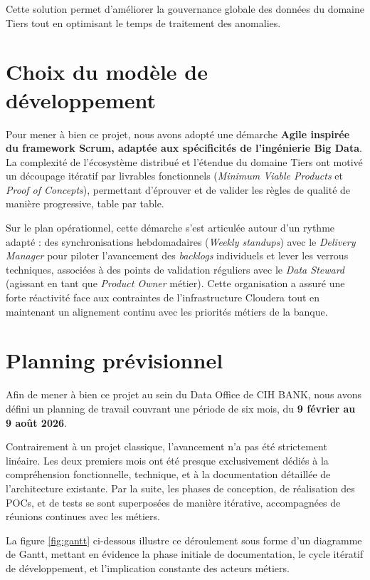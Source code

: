 Cette solution permet d'améliorer la gouvernance globale des données du domaine Tiers tout en optimisant le temps de traitement des anomalies.

\section{Choix du modèle de développement}

Pour mener à bien ce projet, nous avons adopté une démarche \textbf{Agile inspirée du framework Scrum, adaptée aux spécificités de l'ingénierie Big Data}. La complexité de l'écosystème distribué et l'étendue du domaine Tiers ont motivé un découpage itératif par livrables fonctionnels (\textit{Minimum Viable Products} et \textit{Proof of Concepts}), permettant d'éprouver et de valider les règles de qualité de manière progressive, table par table.

Sur le plan opérationnel, cette démarche s'est articulée autour d'un rythme adapté : des synchronisations hebdomadaires (\textit{Weekly standups}) avec le \textit{Delivery Manager} pour piloter l'avancement des \textit{backlogs} individuels et lever les verrous techniques, associées à des points de validation réguliers avec le \textit{Data Steward} (agissant en tant que \textit{Product Owner} métier). Cette organisation a assuré une forte réactivité face aux contraintes de l'infrastructure Cloudera tout en maintenant un alignement continu avec les priorités métiers de la banque.

\section{Planning prévisionnel}

Afin de mener à bien ce projet au sein du Data Office de CIH BANK, nous avons défini un planning de travail couvrant une période de six mois, du \textbf{9 février au 9 août 2026}. 

Contrairement à un projet classique, l'avancement n'a pas été strictement linéaire. Les deux premiers mois ont été presque exclusivement dédiés à la compréhension fonctionnelle, technique, et à la documentation détaillée de l'architecture existante. Par la suite, les phases de conception, de réalisation des POCs, et de tests se sont superposées de manière itérative, accompagnées de réunions continues avec les métiers.

La figure \ref{fig:gantt} ci-dessous illustre ce déroulement sous forme d'un diagramme de Gantt, mettant en évidence la phase initiale de documentation, le cycle itératif de développement, et l'implication constante des acteurs métiers.

